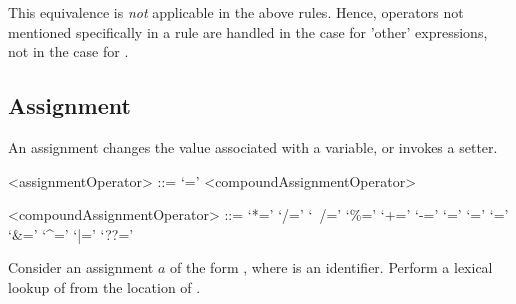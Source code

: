 \documentclass[makeidx]{article}
\begin{document}

\LMHash{}%
This equivalence is \emph{not} applicable in the above rules.
Hence, operators not mentioned specifically in a rule are handled
in the case for 'other' expressions,
not in the case for .



\subsection{Assignment}

\LMHash{}%
An assignment changes the value associated with a variable,
or invokes a setter.

\begin{grammar}
<assignmentOperator> ::= `='
  \alt <compoundAssignmentOperator>

<compoundAssignmentOperator> ::= `*='
  \alt `/='
  \alt `~/='
  \alt `\%='
  \alt `+='
  \alt `-='
  \alt `\ltlt='
  \alt `\gtgtgt='
  \alt `\gtgt='
  \alt `\&='
  \alt `^='
  \alt `|='
  \alt `??='
\end{grammar}

\LMHash{}%
Consider an assignment $a$ of the form ,
where \id{} is an identifier.
Perform a lexical lookup of \code{\id=} from the location of \id.
\end{document}
